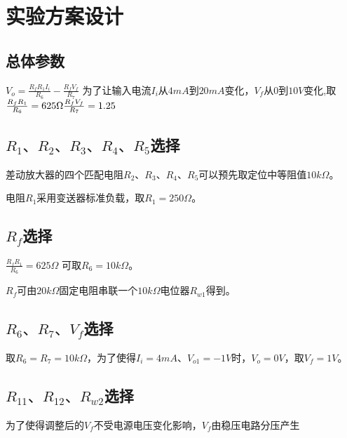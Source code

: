 \documentclass{zjureport}
\begin{document}
\section{实验方案设计}

\subsection{总体参数}
\begin{math}
  V_o = \frac{R_fR_1I_i}{R_6}-\frac{R_fV_f}{R_7}
\end{math}
为了让输入电流$I_i$从$4mA$到$20mA$变化，$V_f$从$0$到$10V$变化,取
\begin{math}
  \frac{R_fR_1}{R_6} = 625\Omega\\
  \frac{R_fV_f}{R_7} = 1.25
\end{math}

\subsection{$R_1\text{、}R_2\text{、}R_3\text{、}R_4\text{、}R_5$选择}

差动放大器的四个匹配电阻$R_2\text{、}R_3\text{、}R_4\text{、}R_5$可以预先取定位中等阻值$10k\Omega$。\par

电阻$R_1$采用变送器标准负载，取$R_1 = 250\Omega$。

\subsection{$R_f$选择}
\begin{math}
  \frac{R_fR_1}{R_6} = 625\Omega
\end{math}
可取$R_6 = 10k\Omega$。

$R_f$可由$20k\Omega$固定电阻串联一个$10k\Omega$电位器$R_{w1}$得到。

\subsection{$R_6\text{、}R_7\text{、}V_f$选择}
取$R_6 = R_7 = 10k\Omega$，为了使得$I_i = 4mA\text{、}V_{o1} = -1V$时，$V_o = 0V$，取$V_f = 1V$。

\subsection{$R_{11}\text{、}R_{12}\text{、}R_{w2}$选择}
为了使得调整后的$V_f$不受电源电压变化影响，$V_f$由稳压电路分压产生\par
\end{document}
